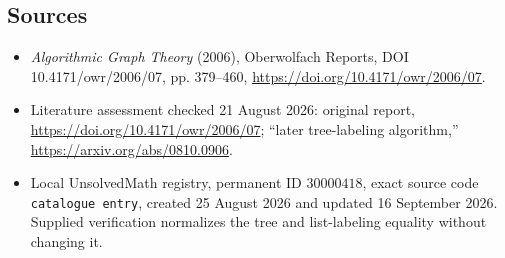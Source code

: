 \documentclass[11pt]{article}
\begin{document}
\subsection{Sources}
\begin{itemize}
\item \emph{Algorithmic Graph Theory} (2006), Oberwolfach Reports, DOI 10.4171/owr/2006/07, pp. 379--460, \url{https://doi.org/10.4171/owr/2006/07}.
\item Literature assessment checked 21 August 2026: original report, \url{https://doi.org/10.4171/owr/2006/07}; ``later tree-labeling algorithm,'' \url{https://arxiv.org/abs/0810.0906}.
\item Local UnsolvedMath registry, permanent ID $30000418$, exact source code \texttt{catalogue entry}, created 25 August 2026 and updated 16 September 2026. Supplied verification normalizes the tree and list-labeling equality without changing it.
\end{itemize}
\end{document}
